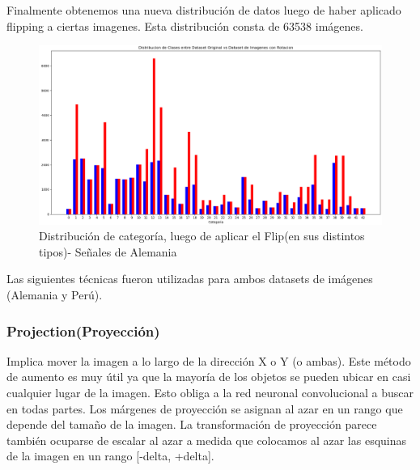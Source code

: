			Finalmente obtenemos una nueva distribución de datos luego de haber aplicado flipping a ciertas imagenes. Esta distribución consta de 63538 imágenes.
			\begin{figure}[H]
				\begin{center}
				\includegraphics[width=1\textwidth]{images/desarrollo/histograms/train_flipped63538}
				\end{center}
				\begin{center}
				\vspace{1em}
				\caption{\small{Distribución de categoría, luego de aplicar el Flip(en sus distintos tipos)- Señales de Alemania}}
				{\small{\fontsize{10}{16.8}\selectfont {Fuente: Elaboración propia}}}
				\end{center}
				\vspace{-1.5em}
			\end{figure}

		Las siguientes técnicas fueron utilizadas para ambos datasets de imágenes (Alemania y Perú).
		
		\subsubsection{Projection(Proyección)}
			Implica mover la imagen a lo largo de la dirección X o Y (o ambas). Este método de aumento es muy útil ya que la mayoría de los objetos se pueden ubicar en casi cualquier lugar de la imagen. Esto obliga a la red neuronal convolucional a buscar en todas partes.
			Los márgenes de proyección se asignan al azar en un rango que depende del tamaño de la imagen. La transformación de proyección parece también ocuparse de escalar al azar a medida que colocamos al azar las esquinas de la imagen en un rango [-delta, +delta].



